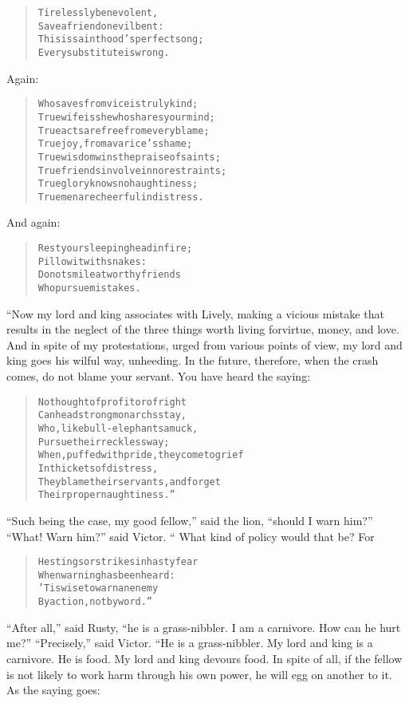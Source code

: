 \documentclass[article, twoside, 14pt]{memoir}
\renewenvironment{verbatim}{%
\begin{quote}%
\vskip -10pt%
\begin{alltt}\normalfont\large}{\end{alltt}%
\end{quote}%
\vskip -10pt
} %
\begin{document}
\begin{verbatim}
Tirelessly benevolent,
Save a friend on evil bent:
This is sainthood's perfect song;
Every substitute is wrong.
\end{verbatim}
Again:

\begin{verbatim}
Who saves from vice is truly kind;
True wife is she who shares your mind;
True acts are free from every blame;
True joy, from avarice's shame;
True wisdom wins the praise of saints;
True friends involve in no restraints;
True glory knows no haughtiness;
True men are cheerful in distress.
\end{verbatim}
And again:

\begin{verbatim}
Rest your sleeping head in fire;
Pillow it with snakes:
Do not smile at worthy friends
Who pursue mistakes.
\end{verbatim}
“Now my lord and king associates with Lively, making a vicious
mistake that results in the neglect of the three things worth
living for{\textemdash}virtue, money, and love. And in spite of my
protestations, urged from various points of view, my lord and king
goes his wilful way, unheeding. In the future, therefore, when the
crash comes, do not blame your servant. You have heard the saying:

\begin{verbatim}
No thought of profit or of right
    Can headstrong monarchs stay,
Who, like bull-elephants amuck,
    Pursue their reckless way;
When, puffed with pride, they come to grief
    In thickets of distress,
They blame their servants, and forget
    Their proper naughtiness.”
\end{verbatim}
``Such being the case, my good fellow,'' said the lion,
``should I warn him?'' ``What! Warn him?'' said Victor. “ What kind
of policy would that be? For

\begin{verbatim}
He stings or strikes in hasty fear
    When warning has been heard:
'Tis wise to warn an enemy
    By action, not by word.”
\end{verbatim}
``After all,'' said Rusty,
``he is a grass-nibbler. I am a carnivore. How can he hurt me?''
``Precisely,'' said Victor. “He is a grass-nibbler. My lord and
king is a carnivore. He is food. My lord and king devours food. In
spite of all, if the fellow is not likely to work harm through his
own power, he will egg on another to it. As the saying goes:
\end{document}
